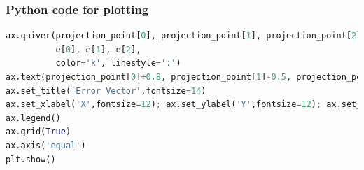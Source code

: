 \documentclass{beamer}
\theoremstyle{remark}
\let\vec\mathbf
\numberwithin{equation}{section}
\begin{document}
 \begin{frame}[fragile]
\frametitle{Python code for plotting }
\begin{lstlisting}[language=Python]
ax.quiver(projection_point[0], projection_point[1], projection_point[2],
          e[0], e[1], e[2],
          color='k', linestyle=':')
ax.text(projection_point[0]+0.8, projection_point[1]-0.5, projection_point[2]+0.5, '$\\vec{e}$')
ax.set_title('Error Vector',fontsize=14)
ax.set_xlabel('X',fontsize=12); ax.set_ylabel('Y',fontsize=12); ax.set_zlabel('Z',fontsize=12)
ax.legend()
ax.grid(True)
ax.axis('equal')
plt.show()

\end{lstlisting}
\end{frame}
\end{document}
